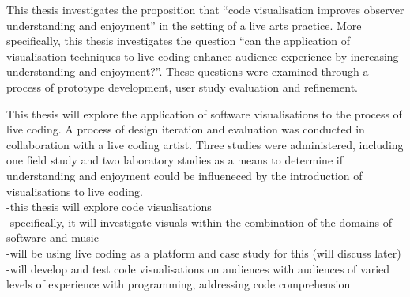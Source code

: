 This thesis investigates the proposition that ``code visualisation improves observer understanding and enjoyment'' in the setting of a live arts practice. More specifically, this thesis investigates the question ``can the application of visualisation techniques to live coding enhance audience experience by increasing understanding and enjoyment?''. These questions were examined through a process of prototype development, user study evaluation and refinement.

This thesis will explore the application of software visualisations to the process of live coding. A process of design iteration and evaluation was conducted in collaboration with a live coding artist. Three studies were administered, including one field study and two laboratory studies as a means to determine if understanding and enjoyment could be influeneced by the introduction of visualisations to live coding.\\
-this thesis will explore code visualisations\\
-specifically, it will investigate visuals within the combination of the domains of software and music\\
-will be using live coding as a platform and case study for this (will discuss later)\\
-will develop and test code visualisations on audiences with audiences of varied levels of experience with programming, addressing code comprehension






